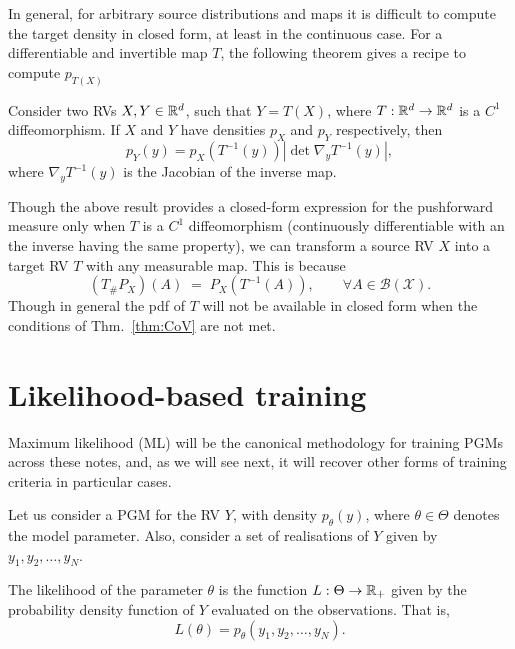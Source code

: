 In general, for arbitrary source distributions and maps it is difficult to compute the target density in closed form, at least in the continuous case. For a differentiable and invertible map $T$, the following theorem gives a recipe to compute $p_{T(X)}$  
\begin{theorem}
	\label{thm:CoV}
	Consider two RVs $X,Y\in{\mathbb R}^d$, such that $Y=T(X)$, where $T:{\mathbb R}^d\to{\mathbb R}^d$ is a $C^1$ diffeomorphism. If $X$ and $Y$ have densities $p_X$ and $p_Y$ respectively, then
	\begin{equation}
		p_Y(y) = p_X(T^{-1}(y))\left|\det \nabla_y T^{-1}(y)\right|, 
	\end{equation}
	where $\nabla_y T^{-1}(y)$ is the Jacobian of the inverse map. 
\end{theorem}

\begin{remark}
	Though the above result provides a closed-form expression for the pushforward measure only when $T$ is a $C^1$ diffeomorphism (continuously differentiable with an the inverse having the same property), we can transform a source RV $X$ into a target RV $T$ with any measurable map. This is because
	\begin{equation}
	(T_\#P_X)(A) \;=\; P_X(T^{-1}(A)), \qquad \forall A\in\mathcal B(\mathcal X).
	\end{equation}
	Though in general the pdf of $T$ will not be available in closed form when the conditions of Thm.~\ref{thm:CoV} are not met.
\end{remark}

\section{Likelihood-based training}

Maximum likelihood (ML) will be the canonical methodology for training PGMs across these notes, and, as we will see next, it will recover other forms of training criteria in particular cases. 

Let us consider a PGM for the RV $Y$, with density $p_\theta(y)$, where $\theta\in\Theta$ denotes the model parameter. Also, consider a set of realisations of $Y$ given by $y_1,y_2,\ldots, y_N$. 

\begin{definition}
	The likelihood of the parameter $\theta$ is the function $L:\Theta\to{\mathbb R}_+$ given by the probability density function of $Y$ evaluated on the observations. That is, 
	\begin{equation}
		L(\theta) = p_\theta(y_1,y_2,\ldots,y_N). 
	\end{equation} 
\end{definition}

